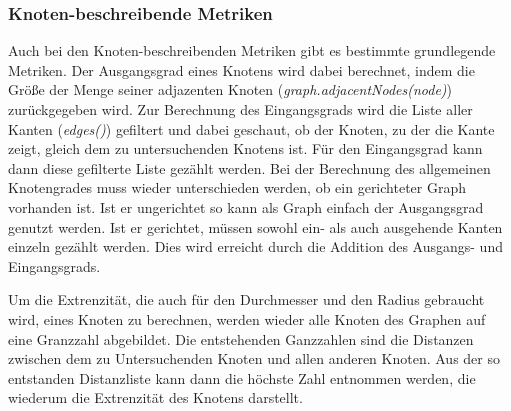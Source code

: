 \documentclass[a4paper,12pt,ngerman,chapterprefix=false,listof=totoc,bibliography=totoc]{scrreprt}
\begin{document}
{{\subsubsection*{Knoten-beschreibende Metriken}
{
Auch bei den Knoten-beschreibenden Metriken gibt es bestimmte grundlegende Metriken. Der Ausgangsgrad eines Knotens wird dabei berechnet, indem die Größe der Menge seiner adjazenten Knoten (\textit{graph.adjacentNodes(node)}) zurückgegeben wird. Zur Berechnung des Eingangsgrads wird die Liste aller Kanten (\textit{edges()}) gefiltert und dabei geschaut, ob der Knoten, zu der die Kante zeigt, gleich dem zu untersuchenden Knotens ist. Für den Eingangsgrad kann dann diese gefilterte Liste gezählt werden. Bei der Berechnung des allgemeinen Knotengrades muss wieder unterschieden werden, ob ein gerichteter Graph vorhanden ist. Ist er ungerichtet so kann als Graph einfach der Ausgangsgrad genutzt werden. Ist er gerichtet, müssen sowohl ein- als auch ausgehende Kanten einzeln gezählt werden. Dies wird erreicht durch die Addition des Ausgangs- und Eingangsgrads.

Um die Extrenzität, die auch für den Durchmesser und den Radius gebraucht wird, eines Knoten zu berechnen, werden wieder alle Knoten des Graphen auf eine Granzzahl abgebildet. Die entstehenden Ganzzahlen sind die Distanzen zwischen dem zu Untersuchenden Knoten und allen anderen Knoten. Aus der so entstanden Distanzliste kann dann die höchste Zahl entnommen werden, die wiederum die Extrenzität des Knotens darstellt.


}
}}
\end{document}

